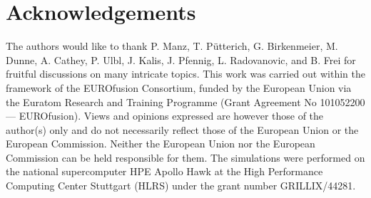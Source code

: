 \documentclass[aps,prl,twocolumn,superscriptaddress]{revtex4-2}
\begin{document}
\section*{Acknowledgements}
The authors would like to thank P. Manz, T. Pütterich, G. Birkenmeier, {M. Dunne, A. Cathey}, P. Ulbl, J. Kalis, J. Pfennig, L. Radovanovic, and B. Frei for fruitful discussions on many intricate topics.
This work was carried out within the framework of the EUROfusion Consortium, funded by the European Union via the Euratom Research and Training Programme (Grant Agreement No 101052200 — EUROfusion).
Views and opinions expressed are however those of the author(s) only and do not necessarily reflect those of the European Union or the European Commission. Neither the European Union nor the European Commission can be held responsible for them.
The simulations were performed on the national supercomputer HPE Apollo Hawk at the High Performance Computing Center Stuttgart (HLRS) under the grant number GRILLIX/44281.


\end{document}
